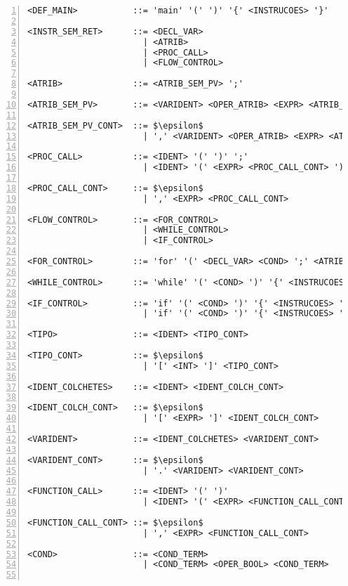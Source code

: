 \begin{lstlisting}[frame=single,numbers=left,breaklines=true,mathescape=true>,basicstyle=\ttfamily\scriptsize]
<DEF_MAIN>           ::= 'main' '(' ')' '{' <INSTRUCOES> '}'

<INSTR_SEM_RET>      ::= <DECL_VAR>
                       | <ATRIB>
                       | <PROC_CALL>
                       | <FLOW_CONTROL>

<ATRIB>              ::= <ATRIB_SEM_PV> ';'

<ATRIB_SEM_PV>       ::= <VARIDENT> <OPER_ATRIB> <EXPR> <ATRIB_SEM_PV_CONT>

<ATRIB_SEM_PV_CONT>  ::= $\epsilon$
                       | ',' <VARIDENT> <OPER_ATRIB> <EXPR> <ATRIB_SEM_PV_CONT>

<PROC_CALL>          ::= <IDENT> '(' ')' ';'
                       | <IDENT> '(' <EXPR> <PROC_CALL_CONT> ')' ';'

<PROC_CALL_CONT>     ::= $\epsilon$
                       | ',' <EXPR> <PROC_CALL_CONT>

<FLOW_CONTROL>       ::= <FOR_CONTROL>
                       | <WHILE_CONTROL>
                       | <IF_CONTROL>

<FOR_CONTROL>        ::= 'for' '(' <DECL_VAR> <COND> ';' <ATRIB_SEM_PV> ')' '{' <INSTRUCOES> '}'

<WHILE_CONTROL>      ::= 'while' '(' <COND> ')' '{' <INSTRUCOES> '}'

<IF_CONTROL>         ::= 'if' '(' <COND> ')' '{' <INSTRUCOES> '}'
                       | 'if' '(' <COND> ')' '{' <INSTRUCOES> '}' 'else' '{' <INSTRUCOES> '}'

<TIPO>               ::= <IDENT> <TIPO_CONT>

<TIPO_CONT>          ::= $\epsilon$
                       | '[' <INT> ']' <TIPO_CONT>

<IDENT_COLCHETES>    ::= <IDENT> <IDENT_COLCH_CONT>

<IDENT_COLCH_CONT>   ::= $\epsilon$
                       | '[' <EXPR> ']' <IDENT_COLCH_CONT>

<VARIDENT>           ::= <IDENT_COLCHETES> <VARIDENT_CONT>

<VARIDENT_CONT>      ::= $\epsilon$
                       | '.' <VARIDENT> <VARIDENT_CONT>

<FUNCTION_CALL>      ::= <IDENT> '(' ')'
                       | <IDENT> '(' <EXPR> <FUNCTION_CALL_CONT> ')'

<FUNCTION_CALL_CONT> ::= $\epsilon$
                       | ',' <EXPR> <FUNCTION_CALL_CONT>

<COND>               ::= <COND_TERM> 
                       | <COND_TERM> <OPER_BOOL> <COND_TERM>


\end{lstlisting}
